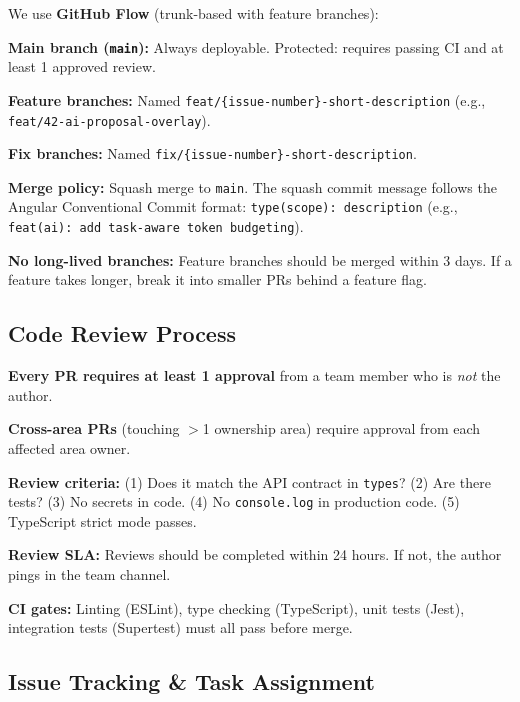 \documentclass[10pt, a4paper]{article}
\begin{document}
We use \textbf{GitHub Flow} (trunk-based with feature branches):

\begin{speclist}
\item \textbf{Main branch (\texttt{main}):} Always deployable. Protected: requires passing CI and at least 1 approved review.
\item \textbf{Feature branches:} Named \texttt{feat/\{issue-number\}-short-description} (e.g., \texttt{feat/42-ai-proposal-overlay}).
\item \textbf{Fix branches:} Named \texttt{fix/\{issue-number\}-short-description}.
\item \textbf{Merge policy:} Squash merge to \texttt{main}. The squash commit message follows the Angular Conventional Commit format: \texttt{type(scope): description} (e.g., \texttt{feat(ai): add task-aware token budgeting}).
\item \textbf{No long-lived branches:} Feature branches should be merged within 3 days. If a feature takes longer, break it into smaller PRs behind a feature flag.
\end{speclist}

\subsection{Code Review Process}

\begin{speclist}
\item \textbf{Every PR requires at least 1 approval} from a team member who is \emph{not} the author.
\item \textbf{Cross-area PRs} (touching $>$1 ownership area) require approval from each affected area owner.
\item \textbf{Review criteria:} (1) Does it match the API contract in \texttt{types}? (2) Are there tests? (3) No secrets in code. (4) No \texttt{console.log} in production code. (5) TypeScript strict mode passes.
\item \textbf{Review SLA:} Reviews should be completed within 24 hours. If not, the author pings in the team channel.
\item \textbf{CI gates:} Linting (ESLint), type checking (TypeScript), unit tests (Jest), integration tests (Supertest) must all pass before merge.
\end{speclist}

\subsection{Issue Tracking \& Task Assignment}
\end{document}
